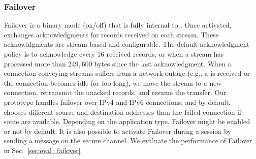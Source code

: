\subsubsection{Failover}\label{failover}
Failover is a binary mode (on/off) that is fully internal to \tcpls.
Once activated, \tcpls exchanges acknowledgments for records received on each
stream. These acknowldgments are stream-based and configurable. The default
acknowledgment policy is to acknowledge every 16 received records, or when a
stream has processed more than $249,600$ bytes since the last acknowledgment.
When a \tcp connection conveying \tcpls streams suffers from a network outage (e.g., a \rst is received or the connection becomes idle for too long), we move the stream to a new \tcp connection, retransmit the unacked records, and resume the transfer. Our prototype handles failover over IPv4 and IPv6 \tcp connections, and by default, chooses different source and destination addresses than the failed \tcp connection if some are available.
Depending on the application type, Failover might be enabled or not by default. It is also possible to activate Failover during a \tcpls session by sending a message on the secure channel. We evaluate the performance of Failover in Sec.~\ref{sec:eval_failover}





